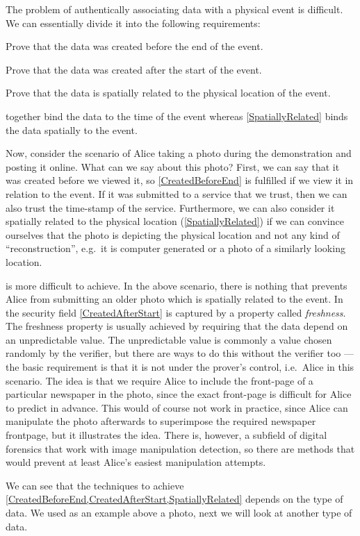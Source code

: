 The problem of authentically associating data with a physical event is 
difficult.
We can essentially divide it into the following requirements:
\begin{requirements}
  \item\label{CreatedBeforeEnd} Prove that the data was created before the end 
    of the event.
  \item\label{CreatedAfterStart} Prove that the data was created after the 
    start of the event.
  \item\label{SpatiallyRelated} Prove that the data is spatially related to 
    the physical location of the event.
\end{requirements}
 together bind the data to the time of 
the event whereas \cref{SpatiallyRelated} binds the data spatially to the 
event.

Now, consider the scenario of Alice taking a photo during the demonstration and 
posting it online.
What can we say about this photo?
First, we can say that it was created before we viewed it, so 
\cref{CreatedBeforeEnd} is fulfilled if we view it in relation to the event.
If it was submitted to a service that we trust, then we can also trust the 
time-stamp of the service.
Furthermore, we can also consider it spatially related to the physical location
(\cref{SpatiallyRelated}) if we can convince ourselves that the photo is 
depicting the physical location and not any kind of \enquote{reconstruction}, 
e.g.\ it is computer generated or a photo of a similarly looking location.

 is more difficult to achieve.
In the above scenario, there is nothing that prevents Alice from submitting an 
older photo which is spatially related to the event.
In the security field \cref{CreatedAfterStart} is captured by a property called 
\emph{freshness}.
The freshness property is usually achieved by requiring that the data depend on
an unpredictable value.
The unpredictable value is commonly a value chosen randomly by the verifier, 
but there are ways to do this without the verifier too --- the basic 
requirement is that it is not under the prover's control, i.e.\ Alice in this 
scenario.
The idea is that we require Alice to include the front-page of a particular 
newspaper in the photo, since the exact front-page is difficult for Alice to 
predict in advance.
This would of course not work in practice, since Alice can manipulate the photo 
afterwards to superimpose the required newspaper frontpage, but it illustrates 
the idea.
There is, however, a subfield of digital forensics that work with image 
manipulation detection, so there are methods that would prevent at least 
Alice's easiest manipulation attempts.

We can see that the techniques to achieve 
\cref{CreatedBeforeEnd,CreatedAfterStart,SpatiallyRelated} depends on the type 
of data.
We used as an example above a photo, next we will look at another type of data.
